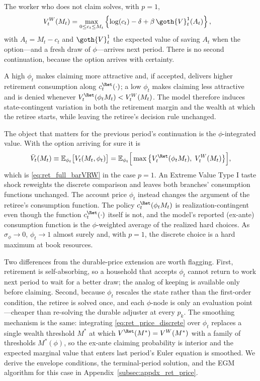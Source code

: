 The worker who does not claim solves, with $p=1$,
\begin{align}
	V_t^{W}(M_t)
	&= \max_{0\le c_t\le M_t}
	\left\{
		\log(c_t)-\delta
		+ \beta\,\goth{V}_t^{1}(A_t)
	\right\},
	\label{eq:ret_price_VW}
\end{align}
with $A_t=M_t-c_t$ and $\goth{V}_t^{1}$ the expected value of saving $A_t$ when the option---and a fresh draw of $\phi$---arrives next period. There is no second continuation, because the option arrives with certainty.

A high $\phi_t$ makes claiming more attractive and, if accepted, delivers higher retirement consumption along $c_t^{\Ret}(\cdot)$; a low $\phi_t$ makes claiming less attractive and is denied whenever $V_t^{\Ret}(\phi_t M_t)<V_t^{W}(M_t)$. The model therefore induces state-contingent variation in both the retirement margin and the wealth at which the retiree starts, while leaving the retiree's decision rule unchanged.

The object that matters for the previous period's continuation is the $\phi$-integrated value. With the option arriving for sure it is
\begin{align}
	\bar V_t(M_t)
	\equiv \mathbb{E}_{\phi_t}\big[V_t(M_t,\phi_t)\big]
	= \mathbb{E}_{\phi_t}\Big[
		\max\big\{
			V_t^{\Ret}(\phi_t M_t),\;
			V_t^{W}(M_t)
		\big\}
	\Big],
	\label{eq:ret_price_barV}
\end{align}
which is \eqref{eq:ret_full_barVRW} in the case $p=1$. An Extreme Value Type I taste shock reweights the discrete comparison and leaves both branches' consumption functions unchanged. The account price $\phi_t$ instead changes the argument of the retiree's consumption function. The policy $c_t^{\Ret}(\phi_t M_t)$ is realization-contingent even though the function $c_t^{\Ret}(\cdot)$ itself is not, and the model's reported (ex-ante) consumption function is the $\phi$-weighted average of the realized hard choices. As $\sigma_\phi\to 0$, $\phi_t\to 1$ almost surely and, with $p=1$, the discrete choice is a hard maximum at book resources.

Two differences from the durable-price extension are worth flagging. First, retirement is self-absorbing, so a household that accepts $\phi_t$ cannot return to work next period to wait for a better draw; the analog of keeping is available only before claiming. Second, because $\phi_t$ rescales the state rather than the first-order condition, the retiree is solved once, and each $\phi$-node is only an evaluation point---cheaper than re-solving the durable adjuster at every $p_k$. The smoothing mechanism is the same: integrating \eqref{eq:ret_price_discrete} over $\phi_t$ replaces a single wealth threshold $M^\ast$ at which $V^{\Ret}(M^\ast)=V^{W}(M^\ast)$ with a family of thresholds $M^\ast(\phi)$, so the ex-ante claiming probability is interior and the expected marginal value that enters last period's Euler equation is smoothed. We derive the envelope conditions, the terminal-period solution, and the EGM algorithm for this case in Appendix~\ref{subsec:appdx_ret_price}.

